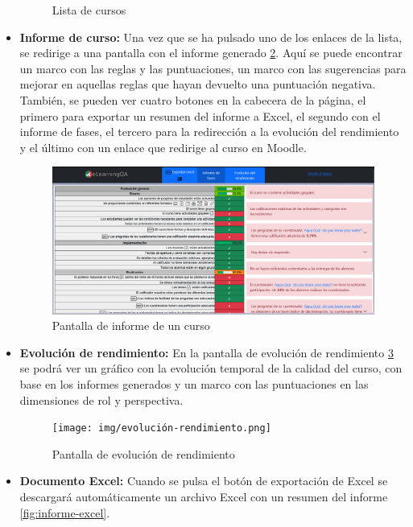 \begin{itemize}
\begin{figure}[H]
            \caption{Lista de cursos}
            \label{fig:lista-cursos}
        \end{figure}
        \item \textbf{Informe de curso:} Una vez que se ha pulsado uno de los enlaces de la lista, se redirige a una pantalla con el informe generado \ref{fig:pantalla-informe}. Aquí se puede encontrar un marco con las reglas y las puntuaciones, un marco con las sugerencias para mejorar en aquellas reglas que hayan devuelto una puntuación negativa.  También, se pueden ver cuatro botones en la cabecera de la página, el primero para exportar un resumen del informe a Excel, el segundo con el informe de fases, el tercero para la redirección a la evolución del rendimiento y el último con un enlace que redirige al curso en Moodle.
            \begin{figure}[H]
                \centering
                \includegraphics[width=1\linewidth]{img/pantalla_informe.png}
                \caption{Pantalla de informe de un curso}
                \label{fig:pantalla-informe}
            \end{figure} 
        \item \textbf{Evolución de rendimiento:} En la pantalla de evolución de rendimiento \ref{fig:evolucion-rendimiento} se podrá ver un gráfico con la evolución temporal de la calidad del curso, con base en los informes generados y un marco con las puntuaciones en las dimensiones de rol y perspectiva. 
        \begin{figure}[H]
            \centering
            \texttt{[image: img/evolución-rendimiento.png]}
            \caption{Pantalla de evolución de rendimiento}
            \label{fig:evolucion-rendimiento}
        \end{figure}
        \item \textbf{Documento Excel:} Cuando se pulsa el botón de exportación de Excel se descargará automáticamente un archivo Excel con un resumen del informe \ref{fig:informe-excel}.

\end{itemize}
